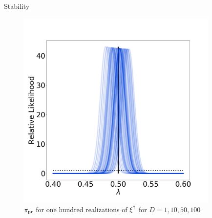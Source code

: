 \begin{block}{Stability}
\begin{figure}
        \includegraphics[width=10cm]{updated_stability_D100_sigma-10E-4}
        \caption*{\large $\operatorname*{\pi_{pr}}$ for one hundred realizations of $\operatorname*{\xi}^\dagger$ for $D=1, 10, 50, 100$}
    \end{figure}

\end{block}
